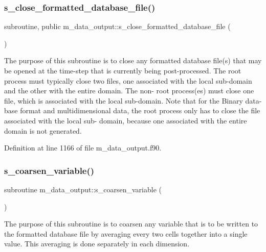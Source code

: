 \subsubsection{\texorpdfstring{s\+\_\+close\+\_\+formatted\+\_\+database\+\_\+file()}{s\_close\_formatted\_database\_file()}}
{\footnotesize\ttfamily subroutine, public m\+\_\+data\+\_\+output\+::s\+\_\+close\+\_\+formatted\+\_\+database\+\_\+file (\begin{DoxyParamCaption}{ }\end{DoxyParamCaption})}



The purpose of this subroutine is to close any formatted database file(s) that may be opened at the time-\/step that is currently being post-\/processed. The root process must typically close two files, one associated with the local sub-\/domain and the other with the entire domain. The non-\/ root process(es) must close one file, which is associated with the local sub-\/domain. Note that for the Binary data-\/ base format and multidimensional data, the root process only has to close the file associated with the local sub-\/ domain, because one associated with the entire domain is not generated. 



Definition at line 1166 of file m\+\_\+data\+\_\+output.\+f90.

\mbox{\label{namespacem__data__output_ae32f7bdb38c6c216a819fb0b3a7e06cd}} 
\subsubsection{\texorpdfstring{s\+\_\+coarsen\+\_\+variable()}{s\_coarsen\_variable()}}
{\footnotesize\ttfamily subroutine m\+\_\+data\+\_\+output\+::s\+\_\+coarsen\+\_\+variable (\begin{DoxyParamCaption}{ }\end{DoxyParamCaption})}



The purpose of this subroutine is to coarsen any variable that is to be written to the formatted database file by averaging every two cells together into a single value. This averaging is done separately in each dimension. 



